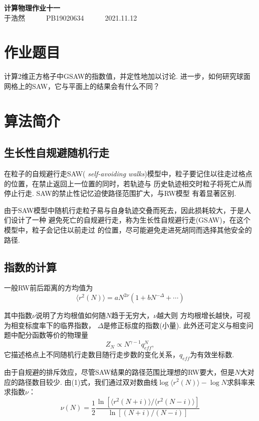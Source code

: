 \documentclass[12pt,a4paper,utf8]{ctexart}
\begin{document}
\begin{center}
    {\LARGE\textbf{计算物理作业十一}}\\
    \textrm{于浩然}~~~~~~\textrm{PB19020634}~~~~~~\textrm{2021.11.12}
\end{center}

\section{作业题目}

计算2维正方格子中GSAW的指数值，并定性地加以讨论.
进一步，如何研究球面网格上的SAW，它与平面上的结果会有什么不同？

\section{算法简介}

\subsection{生长性自规避随机行走}

在粒子的自规避行走SAW( \textsl{self-avoiding
walks})模型中，粒子要记住以往走过格点的位置，在禁止返回上一位置的同时，若轨迹与
历史轨迹相交时粒子将死亡从而停止行走. SAW的禁止性记忆迫使路径范围扩大，与RW模型
有着显著区别. 

由于SAW模型中随机行走粒子易与自身轨迹交叠而死去，因此损耗较大，于是人们设计了一种
避免死亡的自规避行走，称为生长性自规避行走(GSAW)，在这个模型中，粒子会记住以前走过
的位置，尽可能避免走进死胡同而选择其他安全的路径.

\subsection{指数的计算}

一般RW前后距离的方均值为
\begin{equation}
    \langle r^2(N) \rangle = aN^{2\nu}(1+bN^{-\Delta} + \cdots)
\end{equation}

其中指数$\nu$说明了方均根值如何随$N$趋于无穷大，$\nu$越大则
方均根增长越快，可视为相变标度率下的临界指数，
$\Delta$是修正标度的指数(小量). 此外还可定义与相变问题中配分函数等价的物理量
\begin{equation}
    Z_N \propto N^{\gamma-1} q_{eff}^N,
\end{equation}
它描述格点上不同随机行走数目随行走步数的变化关系，$q_{eff}$为有效坐标数.

由于自规避的排斥效应，尽管SAW结果的路径范围比理想的RW要大，但是$N$大对应的路径数目较少. 
由(1)式，我们通过双对数曲线$\log \langle r^2(N) \rangle - \log
N$求斜率来求指数$\nu$：
\begin{equation}
    \nu(N) = \frac{1}{2} 
    \frac{\ln [ \langle r^2(N+i)\rangle / \langle r^2(N-i) \rangle ]}{\ln
    [(N+i)/(N-i)]}
\end{equation}
\end{document}
